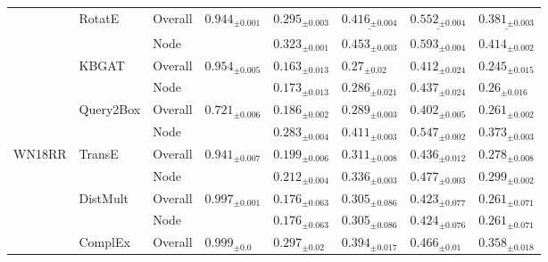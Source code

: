 \begin{table}[ht!]
\begin{adjustbox}{width=\textwidth}
\begin{tabular}{llllllll}
         & RotatE & Overall &  ${{0.944}_{\pm 0.001}}$ &     $\mathbf{{0.295}_{\pm 0.003}}$ &  $\underline{{0.416}_{\pm 0.004}}$ &  $\underline{{0.552}_{\pm 0.004}}$ &  $\underline{{0.381}_{\pm 0.003}}$ \\
         &           & Node &                          &     $\mathbf{{0.323}_{\pm 0.001}}$ &     $\mathbf{{0.453}_{\pm 0.003}}$ &     $\mathbf{{0.593}_{\pm 0.004}}$ &     $\mathbf{{0.414}_{\pm 0.002}}$ \\
         & KBGAT & Overall &  ${{0.954}_{\pm 0.005}}$ &            ${{0.163}_{\pm 0.013}}$ &              ${{0.27}_{\pm 0.02}}$ &            ${{0.412}_{\pm 0.024}}$ &            ${{0.245}_{\pm 0.015}}$ \\
         &           & Node &                          &            ${{0.173}_{\pm 0.013}}$ &            ${{0.286}_{\pm 0.021}}$ &            ${{0.437}_{\pm 0.024}}$ &             ${{0.26}_{\pm 0.016}}$ \\
         & Query2Box & Overall &  ${{0.721}_{\pm 0.006}}$ &     $\mathbf{{0.186}_{\pm 0.002}}$ &     $\mathbf{{0.289}_{\pm 0.003}}$ &     $\mathbf{{0.402}_{\pm 0.005}}$ &     $\mathbf{{0.261}_{\pm 0.002}}$ \\
         &           & Node &                          &     $\mathbf{{0.283}_{\pm 0.004}}$ &     $\mathbf{{0.411}_{\pm 0.003}}$ &     $\mathbf{{0.547}_{\pm 0.002}}$ &     $\mathbf{{0.373}_{\pm 0.003}}$ \\
\midrule
WN18RR & TransE & Overall &  ${{0.941}_{\pm 0.007}}$ &     $\mathbf{{0.199}_{\pm 0.006}}$ &     $\mathbf{{0.311}_{\pm 0.008}}$ &     $\mathbf{{0.436}_{\pm 0.012}}$ &     $\mathbf{{0.278}_{\pm 0.008}}$ \\
         &           & Node &                          &     $\mathbf{{0.212}_{\pm 0.004}}$ &     $\mathbf{{0.336}_{\pm 0.003}}$ &     $\mathbf{{0.477}_{\pm 0.003}}$ &     $\mathbf{{0.299}_{\pm 0.002}}$ \\
         & DistMult & Overall &  ${{0.997}_{\pm 0.001}}$ &            ${{0.176}_{\pm 0.063}}$ &            ${{0.305}_{\pm 0.086}}$ &            ${{0.423}_{\pm 0.077}}$ &            ${{0.261}_{\pm 0.071}}$ \\
         &           & Node &                          &            ${{0.176}_{\pm 0.063}}$ &            ${{0.305}_{\pm 0.086}}$ &            ${{0.424}_{\pm 0.076}}$ &            ${{0.261}_{\pm 0.071}}$ \\
         & ComplEx & Overall &    ${{0.999}_{\pm 0.0}}$ &             ${{0.297}_{\pm 0.02}}$ &            ${{0.394}_{\pm 0.017}}$ &             ${{0.466}_{\pm 0.01}}$ &            ${{0.358}_{\pm 0.018}}$ \\

\end{tabular}
\end{adjustbox}
\end{table}
